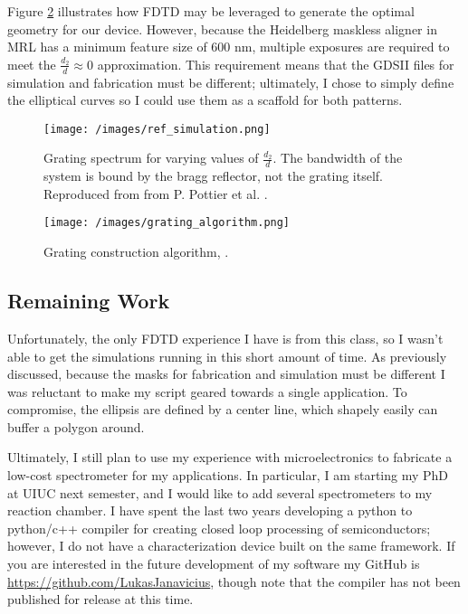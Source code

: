 \documentclass{article}
\begin{document}
    Figure \ref{fig:alg} illustrates how FDTD may be leveraged to generate the optimal geometry for our device. However, because the Heidelberg maskless aligner in MRL has a minimum feature size of 600 nm, multiple exposures are required to meet the $\frac{d_2}{d} \approx 0$ approximation. This requirement means that the GDSII files for simulation and fabrication must be different; ultimately, I chose to simply define the elliptical curves so I could use them as a scaffold for both patterns.

    \begin{figure}[H]        
    \centering
    \scriptsize 
    \texttt{[image: /images/ref\_simulation.png]}
    \caption{\label{fig:ref_spec} Grating spectrum for varying values of $\frac{d_2}{d}$. The bandwidth of the system is bound by the bragg reflector, not the grating itself. Reproduced from from P. Pottier et al. \cite{Packirisamy2012Mono-OrderGrating}.}
    \end{figure}

    \begin{figure}[H]        
    \centering
    \scriptsize 
    \texttt{[image: /images/grating\_algorithm.png]}
    \caption{\label{fig:alg} Grating construction algorithm, .}
    \end{figure}
    
    \subsection{Remaining Work}
    Unfortunately, the only FDTD experience I have is from this class, so I wasn't able to get the simulations running in this short amount of time. As previously discussed, because the masks for fabrication and simulation must be different I was reluctant to make my script geared towards a single application. To compromise, the ellipsis are defined by a center line, which shapely easily can buffer a polygon around. 
    
    Ultimately, I still plan to use my experience with microelectronics to fabricate a low-cost spectrometer for my applications. In particular, I am starting my PhD at UIUC next semester, and I would like to add several spectrometers to my reaction chamber. I have spent the last two years developing a python to python/c++ compiler for creating closed loop processing of semiconductors; however, I do not have a characterization device built on the same framework. If you are interested in the future development of my software my GitHub is \url{https://github.com/LukasJanavicius}, though note that the compiler has not been published for release at this time. 
\end{document}
